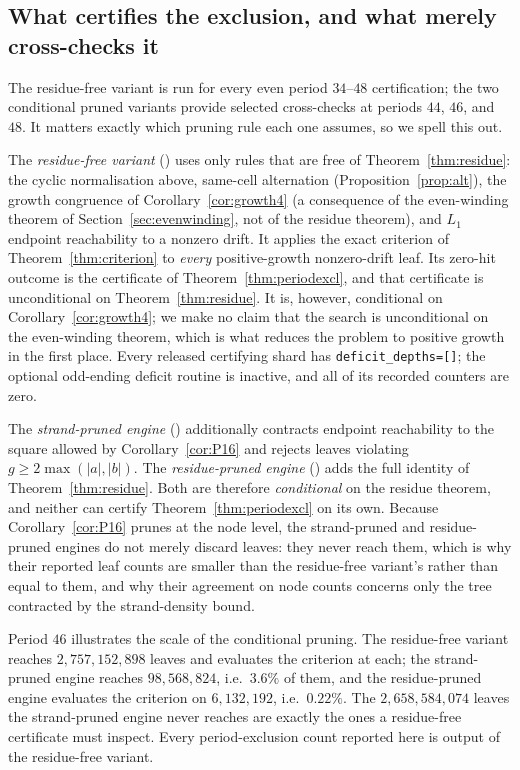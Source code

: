 \documentclass[11pt,letterpaper]{article}
\theoremstyle{plain}
\theoremstyle{definition}
\newcommand{\growth}{g}
\begin{document}
\begin{NoHyper}
\subsection*{What certifies the exclusion, and what merely cross-checks it}

The residue-free variant is run for every even period $34$--$48$ certification;
the two conditional pruned variants provide selected cross-checks at periods
$44$, $46$, and $48$. It matters exactly which pruning rule each one assumes, so we
spell this out.

The \emph{residue-free variant} () uses only
rules that are free of Theorem~\ref{thm:residue}: the cyclic normalisation above,
same-cell alternation (Proposition~\ref{prop:alt}), the growth congruence of
Corollary~\ref{cor:growth4} (a consequence of the even-winding theorem of
Section~\ref{sec:evenwinding}, not of the residue theorem), and $L_1$ endpoint
reachability to a nonzero drift. It applies the exact
criterion of
Theorem~\ref{thm:criterion} to \emph{every} positive-growth nonzero-drift leaf. Its
zero-hit outcome is the certificate of Theorem~\ref{thm:periodexcl}, and that
certificate is unconditional on Theorem~\ref{thm:residue}. It is, however,
conditional on Corollary~\ref{cor:growth4}; we make no claim that the search is
unconditional on the even-winding theorem, which is what reduces the problem to
positive growth in the first place. Every released certifying shard has
\texttt{deficit\_depths=[]}; the optional odd-ending deficit routine is inactive, and
all of its recorded counters are zero.

The \emph{strand-pruned engine} () additionally
contracts endpoint reachability to the square allowed by Corollary~\ref{cor:P16} and
rejects leaves violating $\growth\ge2\max(|a|,|b|)$. The \emph{residue-pruned engine}
() adds the full identity of
Theorem~\ref{thm:residue}. Both are therefore \emph{conditional} on the residue
theorem, and neither can certify Theorem~\ref{thm:periodexcl} on its own. Because
Corollary~\ref{cor:P16} prunes at the node level, the strand-pruned and
residue-pruned engines do not merely discard leaves: they never reach them, which is
why their reported leaf counts are smaller than the residue-free variant's rather than
equal to them, and why their agreement on node counts concerns only the tree
contracted by the strand-density bound.

Period $46$ illustrates the scale of the conditional pruning. The residue-free
variant reaches $2{,}757{,}152{,}898$
leaves and evaluates the criterion at each; the strand-pruned engine reaches
$98{,}568{,}824$, i.e.\ $3.6\%$ of them, and the residue-pruned engine evaluates the
criterion on $6{,}132{,}192$, i.e.\ $0.22\%$. The $2{,}658{,}584{,}074$ leaves the
strand-pruned engine never reaches are exactly the ones a residue-free certificate
must inspect. Every period-exclusion count reported here is output of the residue-free
variant.


\end{NoHyper}
\end{document}
